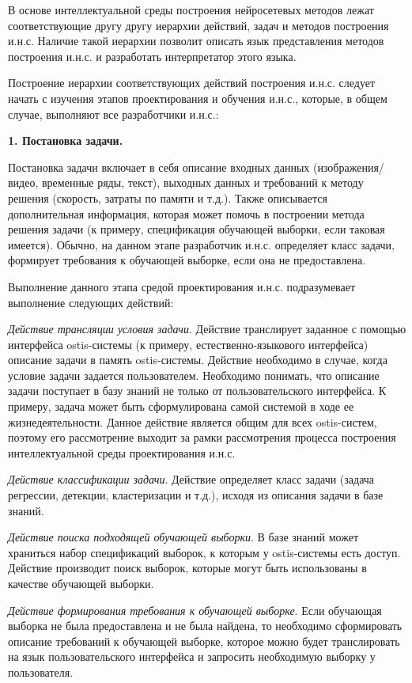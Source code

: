 В основе интеллектуальной среды построения нейросетевых методов лежат соответствующие другу другу иерархии действий, задач и методов построения и.н.с. Наличие такой иерархии позволит описать язык представления методов построения и.н.с. и разработать интерпретатор этого языка.

Построение иерархии соответствующих действий построения и.н.с. следует начать с изучения этапов проектирования и обучения и.н.с., которые, в общем случае, выполняют все разработчики и.н.с.:


\textbf{1. Постановка задачи. }

Постановка задачи включает в себя описание входных данных (изображения/видео, временные ряды, текст), выходных данных и требований к методу решения (скорость, затраты по памяти и т.д.). Также описывается дополнительная информация, которая может помочь в построении метода решения задачи (к примеру, спецификация обучающей выборки, если таковая имеется). Обычно, на данном этапе разработчик и.н.с. определяет класс задачи, формирует требования к обучающей выборке, если она не предоставлена.

Выполнение данного этапа средой проектирования и.н.с. подразумевает выполнение следующих действий:
\begin{textitemize}
	\item \textit{Действие трансляции условия задачи}. Действие транслирует заданное с помощью интерфейса ostis-системы (к примеру, естественно-языкового интерфейса) описание задачи в память ostis-системы. Действие необходимо в случае, когда условие задачи задается пользователем. Необходимо понимать, что описание задачи поступает в базу знаний не только от пользовательского интерфейса. К примеру, задача может быть сформулирована самой системой в ходе ее жизнедеятельности.
	Данное действие является общим для всех ostis-систем, поэтому его рассмотрение выходит за рамки рассмотрения процесса построения интеллектуальной среды проектирования и.н.с.
	\item \textit{Действие классификации задачи}. Действие определяет класс задачи (задача регрессии, детекции, кластеризации и т.д.), исходя из описания задачи в базе знаний.
	\item \textit{Действие поиска подходящей обучающей выборки}. В базе знаний может храниться набор спецификаций выборок, к которым у ostis-системы есть доступ. Действие производит поиск выборок, которые могут быть использованы в качестве обучающей выборки.
	\item \textit{Действие формирования требования к обучающей выборке}. Если обучающая выборка не была предоставлена и не была найдена, то необходимо сформировать описание требований к обучающей выборке, которое можно будет транслировать на язык пользовательского интерфейса и запросить необходимую выборку у пользователя.
\end{textitemize}


